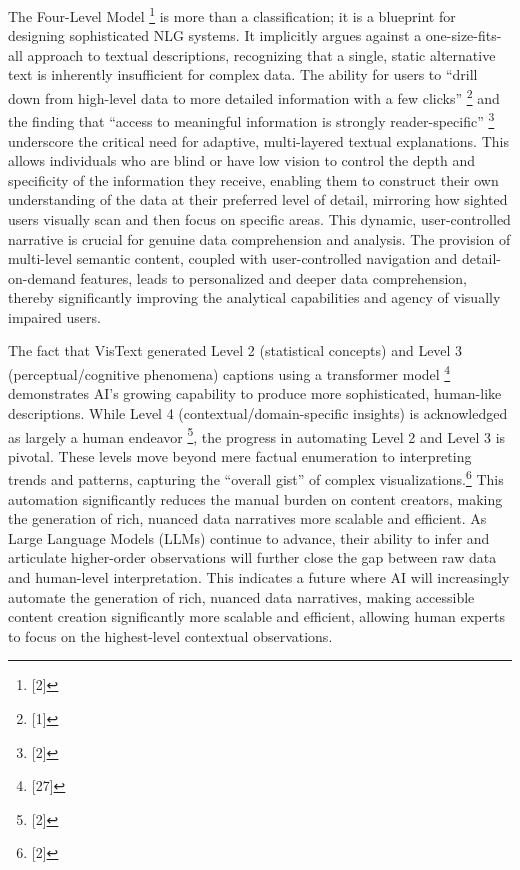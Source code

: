 The Four-Level Model \footnote{[2]} is more than a classification; it is a blueprint for designing sophisticated NLG systems. It implicitly argues against a one-size-fits-all approach to textual descriptions, recognizing that a single, static alternative text is inherently insufficient for complex data. The ability for users to ``drill down from high-level data to more detailed information with a few clicks'' \footnote{[1]} and the finding that ``access to meaningful information is strongly reader-specific'' \footnote{[2]} underscore the critical need for adaptive, multi-layered textual explanations. This allows individuals who are blind or have low vision to control the depth and specificity of the information they receive, enabling them to construct their own understanding of the data at their preferred level of detail, mirroring how sighted users visually scan and then focus on specific areas. This dynamic, user-controlled narrative is crucial for genuine data comprehension and analysis. The provision of multi-level semantic content, coupled with user-controlled navigation and detail-on-demand features, leads to personalized and deeper data comprehension, thereby significantly improving the analytical capabilities and agency of visually impaired users.

The fact that VisText generated Level 2 (statistical concepts) and Level 3 (perceptual/cognitive phenomena) captions using a transformer model \footnote{[27]} demonstrates AI's growing capability to produce more sophisticated, human-like descriptions. While Level 4 (contextual/domain-specific insights) is acknowledged as largely a human endeavor \footnote{[2]}, the progress in automating Level 2 and Level 3 is pivotal. These levels move beyond mere factual enumeration to interpreting trends and patterns, capturing the ``overall gist'' of complex visualizations.\footnote{[2]} This automation significantly reduces the manual burden on content creators, making the generation of rich, nuanced data narratives more scalable and efficient. As Large Language Models (LLMs) continue to advance, their ability to infer and articulate higher-order observations will further close the gap between raw data and human-level interpretation. This indicates a future where AI will increasingly automate the generation of rich, nuanced data narratives, making accessible content creation significantly more scalable and efficient, allowing human experts to focus on the highest-level contextual observations.

